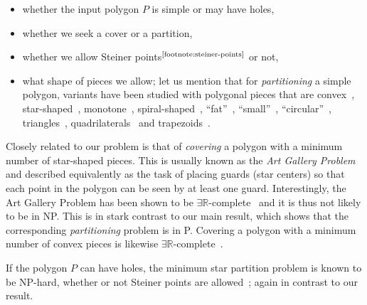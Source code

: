 \documentclass[10pt,a4paper]{article}
\begin{document}
\begin{itemize}[noitemsep,topsep=0pt,parsep=0pt,partopsep=0pt]
\item whether the input polygon $P$ is simple or may have holes, 
\item whether we seek a cover or a partition,
\item whether we allow Steiner points${}^\text{\ref{footnote:steiner-points}}$ or not,
\item what shape of pieces we allow; let us mention that for \emph{partitioning} a simple polygon, variants have been studied with polygonal pieces that are convex~\cite{DBLP:journals/tc/FengP75,DBLP:journals/tc/Schachter78,chazelle1985optimal,DBLP:journals/siamcomp/Keil85,DBLP:conf/focs/Chazelle82,DBLP:journals/iandc/HertelM85,DBLP:journals/ijcga/KeilS02}, star-shaped~\cite{DBLP:journals/tc/FengP75,DBLP:journals/siamcomp/Keil85,DBLP:journals/algorithmica/LiuN91}, monotone~\cite{DBLP:journals/ipl/GareyJPT78,DBLP:journals/ipl/LiuN88}, spiral-shaped~\cite{DBLP:journals/siamcomp/Keil85}, ``fat''~\cite{DBLP:journals/comgeo/Kreveld98,DBLP:journals/comgeo/Damian04,DBLP:conf/cccg/BuchinS21}, ``small''~\cite{DBLP:conf/esa/ArkinD0GMPT20,damian2004computing}, ``circular''~\cite{DBLP:conf/cccg/Damian-IordacheO03}, triangles~\cite{DBLP:journals/jal/AsanoAP86,DBLP:journals/dcg/Chazelle91}, quadrilaterals~\cite{DBLP:conf/compgeom/Lubiw85,DBLP:conf/compgeom/Muller-HannemannW97} and trapezoids~\cite{DBLP:journals/jacm/AsanoAI86}.
\end{itemize}

Closely related to our problem is that of \emph{covering} a polygon with a minimum number of star-shaped pieces.
This is usually known as the \emph{Art Gallery Problem} and described equivalently as the task of placing guards (star centers) so that each point in the polygon can be seen by at least one guard.
Interestingly, the Art Gallery Problem has been shown to be $\exists \mathbb R$-complete~\cite{DBLP:journals/jacm/AbrahamsenAM22} and it is thus not likely to be in \textsf{NP}. This is in stark contrast to our main result, which shows that the corresponding \emph{partitioning} problem is in \textsf{P}.
Covering a polygon with a minimum number of convex pieces is likewise $\exists \mathbb R$-complete~\cite{DBLP:conf/focs/Abrahamsen21}.

If the polygon $P$ can have holes, the minimum star partition problem is known to be \textsf{NP}-hard, whether or not Steiner points are allowed~\cite{o1987art}; again in contrast to our result.
\end{document}

